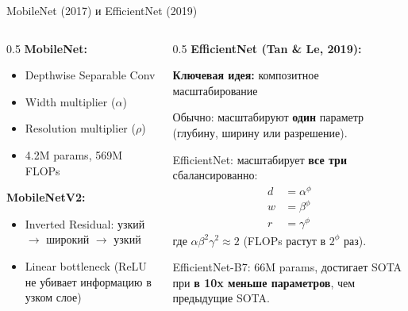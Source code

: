 \documentclass[aspectratio=169, 9pt]{beamer}
\begin{document}
\begin{frame}{MobileNet (2017) и EfficientNet (2019)}
  \begin{columns}[T]
    \begin{column}{0.5\textwidth}
      \textbf{MobileNet:}
      \begin{itemize}
        \item Depthwise Separable Conv
        \item Width multiplier ($\alpha$)
        \item Resolution multiplier ($\rho$)
        \item 4.2M params, 569M FLOPs
      \end{itemize}
      
      \textbf{MobileNetV2:}
      \begin{itemize}
        \item Inverted Residual: узкий $\to$ широкий $\to$ узкий
        \item Linear bottleneck (ReLU не убивает информацию в узком слое)
      \end{itemize}
    \end{column}
    \begin{column}{0.5\textwidth}
      \textbf{EfficientNet (Tan \& Le, 2019):}
      
      \textbf{Ключевая идея:} композитное масштабирование
      
      \vspace{0.3em}
      Обычно: масштабируют \textbf{один} параметр (глубину, ширину или разрешение).
      
      EfficientNet: масштабирует \textbf{все три} сбалансированно:
      \[
      \begin{aligned}
        d &= \alpha^\phi \\
        w &= \beta^\phi \\
        r &= \gamma^\phi
      \end{aligned}
      \]
      где $\alpha\beta^2\gamma^2 \approx 2$ (FLOPs растут в $2^\phi$ раз).
      
      \vspace{0.3em}
      EfficientNet-B7: 66M params, достигает SOTA при \textbf{в 10x меньше параметров}, чем предыдущие SOTA.
    \end{column}
  \end{columns}
\end{frame}
\end{document}
